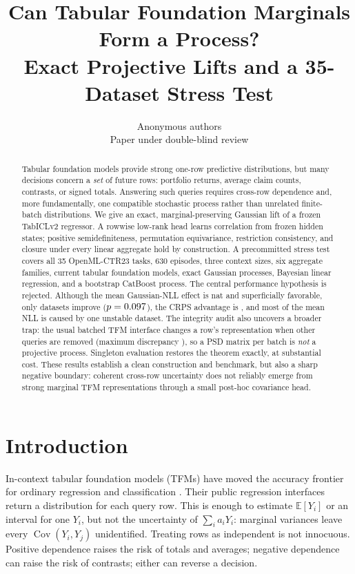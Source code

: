 \documentclass{article}
\title{Can Tabular Foundation Marginals Form a Process?\\
Exact Projective Lifts and a 35-Dataset Stress Test}
\author{Anonymous authors\\
Paper under double-blind review}
\begin{document}
\maketitle

\begin{abstract}
Tabular foundation models provide strong one-row predictive distributions, but
many decisions concern a \emph{set} of future rows: portfolio returns, average
claim counts, contrasts, or signed totals.  Answering such queries requires
cross-row dependence and, more fundamentally, one compatible stochastic
process rather than unrelated finite-batch distributions.  We give an exact,
marginal-preserving Gaussian lift of a frozen TabICLv2 regressor.  A rowwise
low-rank head learns correlation from frozen hidden states; positive
semidefiniteness, permutation equivariance, restriction consistency, and
closure under every linear aggregate hold by construction.  A precommitted
stress test covers all 35 OpenML-CTR23 tasks, 630 episodes, three context
sizes, six aggregate families, current tabular foundation models, exact
Gaussian processes, Bayesian linear regression, and a bootstrap CatBoost
process.  The central performance hypothesis is rejected.  Although the
mean Gaussian-NLL effect is \NLLAdv{} nat and superficially favorable, only
\NLLWins{} datasets improve ($p=0.097$), the CRPS advantage is
\CRPSAdv{}, and most of the mean NLL is caused by
one unstable dataset.  The integrity audit also uncovers a broader trap:
the usual batched TFM interface changes a row's representation when other
queries are removed (maximum discrepancy \BatchedAuditMax), so a PSD matrix
per batch is \emph{not} a projective process.  Singleton evaluation restores
the theorem exactly, at substantial cost.  These results establish a clean
construction and benchmark, but also a sharp negative boundary: coherent
cross-row uncertainty does not reliably emerge from strong marginal TFM
representations through a small post-hoc covariance head.
\end{abstract}

\section{Introduction}

In-context tabular foundation models (TFMs) have moved the accuracy frontier
for ordinary regression and classification
\citep{hollmann2025tabpfn,qu2026tabiclv2,grinsztajn2026tabpfn3}.  Their public
regression interfaces return a distribution for each query row.  This is
enough to estimate $\mathbb{E}[Y_i]$ or an interval for one $Y_i$, but not the
uncertainty of $\sum_i a_iY_i$: marginal variances leave every
$\operatorname{Cov}(Y_i,Y_j)$ unidentified.  Treating rows as independent is
not innocuous.  Positive dependence raises the risk of totals and averages;
negative dependence can raise the risk of contrasts; either can reverse a
decision.
\end{document}
